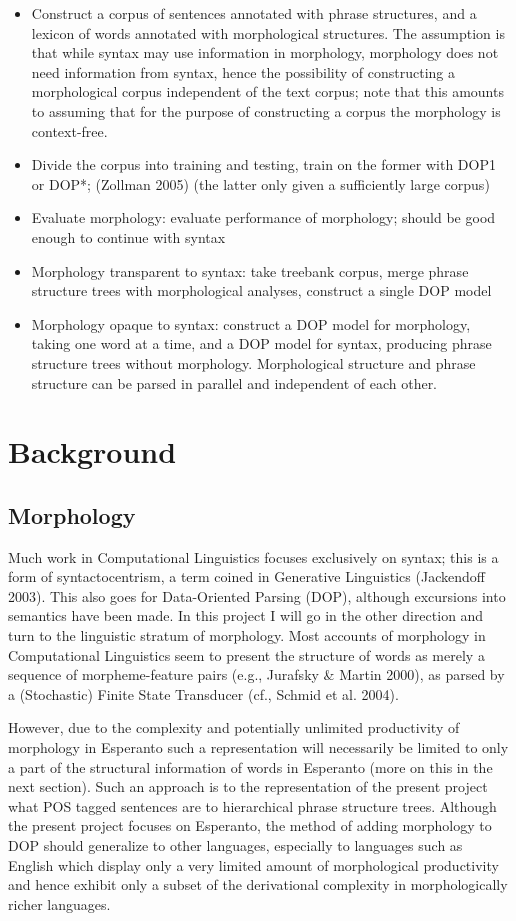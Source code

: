 \documentclass[10pt,a4paper]{article}
\begin{document}
\begin{itemize}
\item Construct a corpus of sentences annotated with phrase structures, and a 
lexicon of words annotated with morphological structures. The assumption is
that while syntax may use information in morphology, morphology does not need
information from syntax, hence the possibility of constructing a morphological
corpus independent of the text corpus; note that this amounts to assuming that
for the purpose of constructing a corpus the morphology is context-free.
\item Divide the corpus into training and testing, train on the former with DOP1 or 
DOP*; (Zollman 2005) (the latter only given a sufficiently large corpus)
\item Evaluate morphology: evaluate performance of morphology; should be good 
enough to continue with syntax
\item Morphology transparent to syntax: take treebank corpus, merge phrase 
structure trees with morphological analyses, construct a single DOP model
\item Morphology opaque to syntax: construct a DOP model for morphology, taking
one word at a time, and a DOP model for syntax, producing phrase structure
trees without morphology.  Morphological structure and phrase structure can be
parsed in parallel and independent of each other.
\end{itemize}

\section{Background}
\subsection{Morphology}

Much work in Computational Linguistics focuses exclusively on syntax; this is
a form of syntactocentrism, a term coined in Generative Linguistics 
(Jackendoff 2003). This also goes for Data-Oriented Parsing (DOP), although
excursions into semantics have been made. In this project I will go in the
other direction and turn to the linguistic stratum of morphology. Most accounts
of morphology in Computational Linguistics seem to present the structure of
words as merely a sequence of morpheme-feature pairs (e.g., Jurafsky \& Martin
2000), as parsed by a (Stochastic) Finite State Transducer (cf., Schmid et al.
2004).

However, due to the complexity and potentially unlimited productivity of
morphology in Esperanto such a representation will necessarily be limited to
only a part of the structural information of words in Esperanto (more on this
in the next section). Such an approach is to the representation of the present
project what POS tagged sentences are to hierarchical phrase structure trees.
Although the present project focuses on Esperanto, the method of adding
morphology to DOP should generalize to other languages, especially to languages
such as English which display only a very limited amount of morphological
productivity and hence exhibit only a subset of the derivational complexity in
morphologically richer languages.
\end{document}
